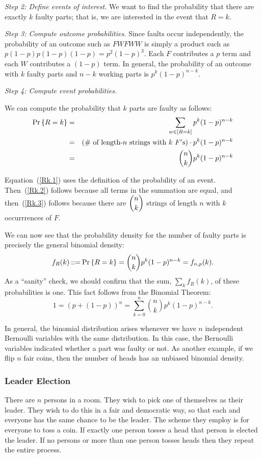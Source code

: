 \documentclass[11pt,twoside]{article}
\begin{document}
\emph{Step 2: Define events of interest. } We want to find the
probability that there are exactly $k$ faulty parts; that is, we are
interested in the event that $R = k$.

\emph{Step 3: Compute outcome probabilities. } Since faults occur
independently, the probability of an outcome such as $FWFWW$ is simply
a product such as $p(1-p)p(1-p)(1-p) = p^2(1-p)^3$.  Each $F$
contributes a $p$ term and each $W$ contributes a $(1-p)$ term.  In
general, the probability of an outcome with $k$ faulty parts and $n-k$
working parts is $p^k (1-p)^{n-k}$.

\emph{Step 4: Compute event probabilities. }

We can compute the probability that $k$ parts are faulty as follows:
\begin{eqnarray}
\mathop{\textup{Pr}}\nolimits\left\{R = k\right\} & = & \sum_{w \in [R=k]}
              p^k (1-p)^{n-k} \label{Rk.1}\\
& = & \mbox{(\# of length-$n$ strings with $k$ $F$'s)} \cdot p^k (1-p)^{n-k} \label{Rk.2}\\
& = & \binom{n}{k} p^k (1-p)^{n-k}\label{Rk.3}
\end{eqnarray}

Equation~(\ref{Rk.1}) uses the definition of the probability of an event.
Then~(\ref{Rk.2}) follows because all terms in the summation are equal,
and then~(\ref{Rk.3}) follows because there are $\dbinom{n}{k}$ strings of
length $n$ with $k$ occurrrences of $F$.

We can now see that the probability density for the number of faulty parts
is precisely the general binomial density:
\[
f_R(k) \mathbin{::=} \mathop{\textup{Pr}}\nolimits\left\{R = k\right\} = \binom{n}{k} p^k (1-p)^{n-k} = f_{n, p}(k).
\]
As a ``sanity'' check, we should confirm that the sum, $\sum_k f_R(k)$, of
these probabilities is one.  This fact follows from the Binomial Theorem:
\[
1 = (p + (1 - p))^n = \sum_{k=0}^n \binom{n}{k}p^k(1-p)^{n-k}.
\]

In general, the binomial distribution arises whenever we have $n$
independent Bernoulli variables with the same distribution.  In this case,
the Bernoulli variables indicated whether a part was faulty or not.  As
another example, if we flip $n$ fair coins, then the number of heads has
an unbiased binomial density.

\subsubsection{Leader Election}

There are $n$ persons in a room. They wish to pick one of themselves as
their leader. They wish to do this in a fair and democratic way, so that
each and everyone has the same chance to be the leader. The scheme they
employ is for everyone to toss a coin. If exactly one person tosses a head
that person is elected the leader. If no persons or more than one person
tosses heads then they repeat the entire process.  
\end{document}
